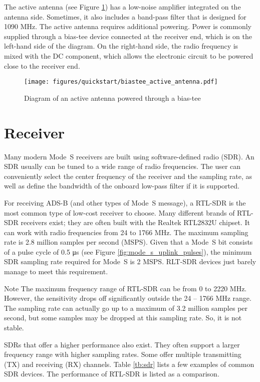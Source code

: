 The active antenna (see Figure \ref{fig:biastee_active_antenna}) has a low-noise amplifier integrated on the antenna side. Sometimes, it also includes a band-pass filter that is designed for 1090 MHz. The active antenna requires additional powering. Power is commonly supplied through a bias-tee device connected at the receiver end, which is on the left-hand side of the diagram. On the right-hand side, the radio frequency is mixed with the DC component, which allows the electronic circuit to be powered close to the receiver end.

\begin{figure}[ht]
  \centering
  \texttt{[image: figures/quickstart/biastee\_active\_antenna.pdf]}
  \caption{Diagram of an active antenna powered through a bias-tee}
  \label{fig:biastee_active_antenna}
\end{figure}


\section{Receiver}

Many modern Mode~S receivers are built using software-defined radio (SDR). An SDR usually can be tuned to a wide range of radio frequencies. The user can conveniently select the center frequency of the receiver and the sampling rate, as well as define the bandwidth of the onboard low-pass filter if it is supported.

For receiving ADS-B (and other types of Mode~S message), a RTL-SDR is the most common type of low-cost receiver to choose. Many different brands of RTL-SDR receivers exist; they are often built with the Realtek RTL2832U chipset. It can work with radio frequencies from 24 to 1766 MHz. The maximum sampling rate is 2.8 million samples per second (MSPS). Given that a Mode~S bit consists of a pulse cycle of 0.5 μs (see Figure \ref{fig:mode_s_uplink_pulses}), the minimum SDR sampling rate required for Mode~S is 2 MSPS. RLT-SDR devices just barely manage to meet this requirement.

\begin{notebox}{Note}
  The maximum frequency range of RTL-SDR can be from 0 to 2220 MHz. However, the sensitivity drops off significantly outside the 24 -- 1766 MHz range. The sampling rate can actually go up to a maximum of 3.2 million samples per second, but some samples may be dropped at this sampling rate. So, it is not stable.
\end{notebox}

SDRs that offer a higher performance also exist. They often support a larger frequency range with higher sampling rates. Some offer multiple transmitting (TX) and receiving (RX) channels. Table \ref{tb:sdr} lists a few examples of common SDR devices. The performance of RTL-SDR is listed as a comparison.

